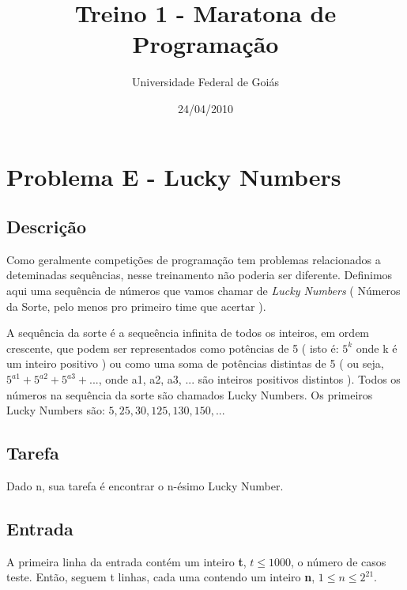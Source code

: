 \documentclass[14pt]{article}
\title{Treino 1 - Maratona de Programa\c{c}\~ao }
\author{Universidade Federal de Goi\'as}
\date{24/04/2010}                                           %
\begin{document}
\maketitle




\section{Problema E - Lucky Numbers}

\subsection{Descri\c{c}\~ao}
Como geralmente competi\c{c}\~oes de programa\c{c}\~ao tem problemas relacionados a deteminadas sequ\^encias, nesse treinamento n\~ao poderia ser diferente.
Definimos aqui uma sequ\^encia de n\'umeros que vamos chamar de \emph{ Lucky Numbers } ( N\'umeros da Sorte, pelo menos pro primeiro time que acertar ).

A sequ\^encia da sorte \'e a seque\^encia infinita de todos os inteiros, em ordem crescente, que podem ser representados como pot\^encias de 5 ( isto \'e: $5^{k}$ onde k \'e um inteiro positivo ) ou como uma soma de pot\^encias distintas de 5 ( ou seja, $5^{ a1} + 5^{ a2} + 5^{ a3}  + ... $, onde a1, a2, a3, ... s\~ao inteiros positivos distintos ). Todos os n\'umeros na sequ\^encia da sorte s\~ao chamados Lucky Numbers. Os primeiros Lucky Numbers s\~ao: $5, 25, 30, 125, 130, 150, ... $ 

\subsection{Tarefa}
Dado n, sua tarefa \'e encontrar o n-\'esimo Lucky Number.

\subsection{Entrada}
A primeira linha da entrada cont\'em um inteiro \textbf{t}, $ t \leq 1000 $,  o n\'umero de casos teste. Ent\~ao, seguem t linhas, cada uma contendo um inteiro \textbf{n}, $1 \leq n \leq 2^{21} $.
\end{document}
